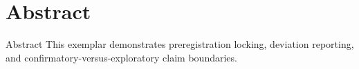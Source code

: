 \documentclass[
  ignorenonframetext,
]{beamer}
\author{\texorpdfstring{}{}}
\date{}
\begin{document}
\section{Abstract}\label{abstract}

\begin{frame}[allowframebreaks]{Abstract}
This exemplar demonstrates preregistration locking, deviation reporting,
and confirmatory-versus-exploratory claim boundaries.
\end{frame}
\end{document}
